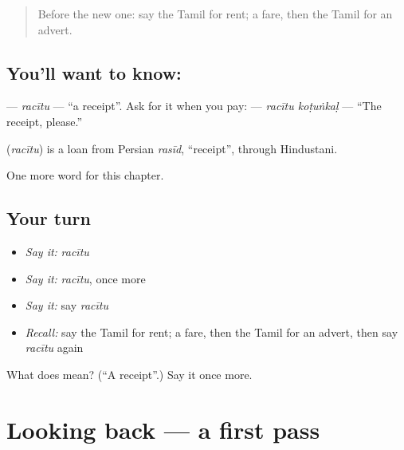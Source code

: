 \label{lesson:TA-C160-racitu}



\begin{quote}
Before the new one: say the Tamil for rent; a fare, then the Tamil for an advert.
\end{quote}

\subsection*{You'll want to know: }
\textbf{} — \emph{racītu} — \textquotedblleft{}a receipt\textquotedblright{}. Ask for it when you pay: \textbf{ } — \emph{racītu koṭuṅkaḷ} — \textquotedblleft{}The receipt, please.\textquotedblright{}

\begin{cousinweb}
\textbf{} (\emph{racītu}) is a loan from Persian \emph{rasīd}, \textquotedblleft{}receipt\textquotedblright{}, through Hindustani.
\end{cousinweb}

\begin{grammarlens}[title={What you've built}]
One more word for this chapter.
\end{grammarlens}

\subsection*{Your turn}
\begin{itemize}
\raggedright
  \item \emph{Say it:} \emph{racītu}
  \item \emph{Say it:} \emph{racītu}, once more
  \item \emph{Say it:} say \emph{racītu}
  \item \emph{Recall:} say the Tamil for rent; a fare, then the Tamil for an advert, then say \emph{racītu} again
\end{itemize}

\begin{tcolorbox}[breakable,colback=teal!4,colframe=teal!35!black,title={Before you move on}]
What does  mean? (\textquotedblleft{}A receipt\textquotedblright{}.) Say it once more.
\end{tcolorbox}
\section[(dialogue)]{Looking back — a first pass}

